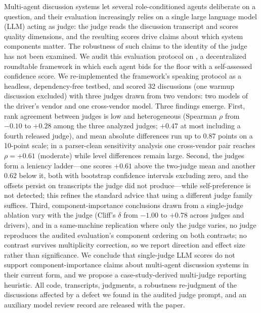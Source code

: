 Multi-agent discussion systems let several role-conditioned agents
deliberate on a question, and their evaluation increasingly relies on a
single large language model (LLM) acting as judge: the judge reads the
discussion transcript and scores quality dimensions, and the resulting
scores drive claims about which system components matter. The robustness
of such claims to the identity of the judge has not been examined. We
audit this evaluation protocol on \sysname{}, a decentralized roundtable
framework in which each agent bids for the floor with a self-assessed
confidence score. We re-implemented the framework's speaking protocol as
a headless, dependency-free testbed, and scored 32 discussions (one
warmup discussion excluded) with three judges drawn from two vendors:
two models of the driver's vendor and one cross-vendor model. Three
findings emerge. First, rank agreement between judges is low and
heterogeneous (Spearman $\rho$ from $-0.10$ to $+0.28$ among the
three analyzed judges; $+0.47$ at most including a fourth released
judge), and mean absolute differences run up to 0.87 points on a
10-point scale; in a parser-clean sensitivity analysis one cross-vendor
pair reaches $\rho=+0.61$ (moderate) while level differences remain
large. Second, the judges form a leniency ladder---one scores
$+0.61$ above the two-judge mean and another $0.62$ below it, both with
bootstrap confidence intervals excluding zero, and the offsets persist
on transcripts the judge did not produce---while self-preference is not
detected; this refines the standard advice that using a different judge
family suffices. Third, component-importance conclusions drawn from a
single-judge ablation vary with the judge (Cliff's $\delta$ from $-1.00$
to $+0.78$ across judges and drivers), and in a same-machine replication
where only the judge varies, no judge reproduces the audited
evaluation's component ordering on both contrasts; no contrast survives
multiplicity correction, so we report direction and effect size rather
than significance.
We conclude that single-judge LLM scores do not support
component-importance claims about multi-agent discussion systems in
their current form, and we propose a case-study-derived multi-judge
reporting heuristic. All code, transcripts, judgments, a robustness re-judgment of the
discussions affected by a defect we found in the audited judge prompt,
and an auxiliary model review record are released with the paper.
